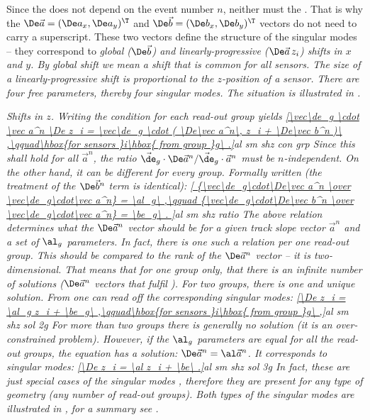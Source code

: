 Since the \lhs{} does not depend on the event number $n$, neither must the \rhs{}. That is why the ${\De\vec a}=(\De a_x, \De a_y)^\T$ and ${\De\vec b=(\De b_x, \De b_y)^\T}$ vectors do not need to carry a superscript. These two vectors define the structure of the singular modes -- they correspond to \em{global} ($\De\vec b$) and \em{linearly-progressive} ($\De\vec a\, z_i$) shifts in $x$ and $y$. By global shift we mean a shift that is common for all sensors. The size of a linearly-progressive shift is proportional to the $z$-position of a sensor. There are four free parameters, thereby four singular modes. The situation is illustrated in .


\em{Shifts in $z$}. Writing the condition  for each read-out group yields
\eqref{\vec\de_g \cdot \vec a^n \De z_i = \vec\de_g \cdot (
	\De\vec a^n\, z_i + \De\vec b^n
)\ ,\qquad\hbox{for sensors }i\hbox{ from group }g\ .}{al sm shz con grp}
Since this shall hold for all $\vec a^n$, the ratio $\vec\de_g\cdot\De\vec a^n / \vec\de_g\cdot\vec a^n$ must be $n$-independent. On the other hand, it can be different for every group. Formally written (the treatment of the $\De\vec b^n$ term is identical):
\eqref{
{\vec\de_g\cdot\De\vec a^n \over \vec\de_g\cdot\vec a^n} = \al_g\ ,\qquad
{\vec\de_g\cdot\De\vec b^n \over \vec\de_g\cdot\vec a^n} = \be_g\ .
}{al sm shz ratio}
The above relation determines what the $\De\vec a^n$ vector should be for a given track slope vector $\vec a^n$ and a set of $\al_g$ parameters. In fact, there is one such a relation per one read-out group. This should be compared to the rank of the $\De\vec a^n$ vector -- it is two-dimensional. That means that for one group only, that there is an infinite number of solutions ($\De\vec a^n$ vectors that fulfil ). For two groups, there is one and unique solution. From  one can read off the corresponding singular modes:
\eqref{\De z_i = \al_g z_i + \be_g\ ,\qquad\hbox{for sensors }i\hbox{ from group }g\ ,}{al sm shz sol 2g}
For more than two groups there is generally no solution (it is an over-constrained problem). However, if the $\al_g$ parameters are equal for all the read-out groups, the equation has a solution: $\De\vec a^n = \al \vec a^n$. It corresponds to singular modes:
\eqref{\De z_i = \al z_i + \be\ .}{al sm shz sol 3g}
In fact, these are just special cases of the singular modes , therefore they are present for any type of geometry (any number of read-out groups). Both types of the singular modes are illustrated in , for a summary see .


